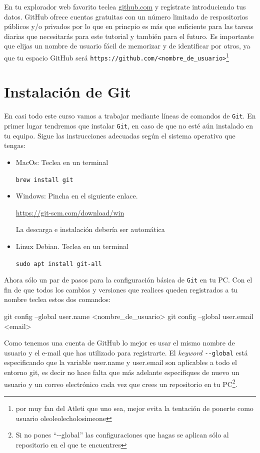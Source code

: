 \documentclass[a4paper,11pt]{report}
\newcommand{\cverb}{\Verb}
\begin{document}
    En tu explorador web favorito teclea \url{github.com} y regístrate introduciendo tus datos. GitHub ofrece cuentas gratuitas con un número limitado de respositorios públicos y/o privados por lo que en princpio es más que suficiente para las tareas diarias que necesitarás para este tutorial y también para el futuro. Es importante que elijas un nombre de usuario fácil de memorizar y de identificar por otros, ya que tu espacio GitHub será \verb+https://github.com/<nombre_de_usuario>+\footnote{por muy fan del Atleti que uno sea, mejor evita la tentación de ponerte como usuario oleoleolecholosimeone}
    
  \section{Instalación de Git}
    En casi todo este curso vamos a trabajar mediante líneas de comandos de \verb+Git+. En primer lugar tendremos que instalar \verb+Git+, en caso de que no esté aún instalado en tu equipo. Sigue las instrucciones adecuadas según el sistema operativo que tengas: 
    
    \begin{itemize}
      \item MacOs: Teclea en un terminal
      
        \cverb|brew install git|

      \item Windows: Pincha en el siguiente enlace. 
      
      \url{https://git-scm.com/download/win}
      
      La descarga e instalación debería ser automática
        
      \item Linux Debian. Teclea en un terminal
      
        \cverb|sudo apt install git-all|
    \end{itemize}
    Ahora sólo un par de pasos para la configuración básica de \verb+Git+ en tu PC. Con el fin de que todos los cambios y versiones que realices queden registrados a tu nombre teclea estos dos comandos:
    \begin{cverbatim}
git config --global user.name <nombre_de_usuario>
git config --global user.email <email>
    \end{cverbatim}
    
    
    Como tenemos una cuenta de GitHub lo mejor es usar el mismo nombre de usuario y el e-mail que has utilizado para registrarte. El \emph{keyword} \cverb+--global+ está especificando que la variable user.name y user.email son aplicables a todo el entorno git, es decir no hace falta que más adelante especifiques de nuevo un usuario y un correo electrónico cada vez que crees un repositorio en tu PC\footnote{Si no pones ``-{}-global'' las configuraciones que hagas se aplican sólo al repositorio en el que te encuentres}.
    
\end{document}
